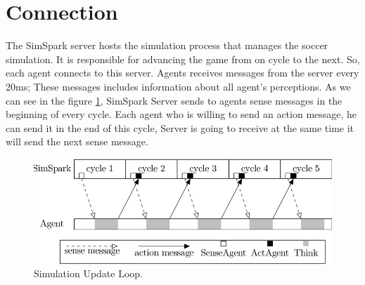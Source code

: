 \section{Connection}
The SimSpark server hosts the simulation process that manages the soccer simulation. It is responsible for advancing the game from on cycle to the next. So, each agent
connects to this server. Agents receives messages from the server every 20ms; These messages includes information about all agent's perceptions. As we can see in the figure \ref{fig:Simulation-Update-Loop}, SimSpark Server sends to agents sense messages in the beginning of every cycle. Each agent who is willing to send an action message, he can send it in the end of this cycle, Server is going to receive at the same time it will send the next sense message.
\begin{figure}[htb!]
\centering
  \includegraphics[scale=0.4]{Chapter2/figures/800px-SimulationUpdateLoopSynchronizationBetweenSimSparkAndAgent.png}
  \caption{Simulation Update Loop.}
  \label{fig:Simulation-Update-Loop}
\end{figure}












